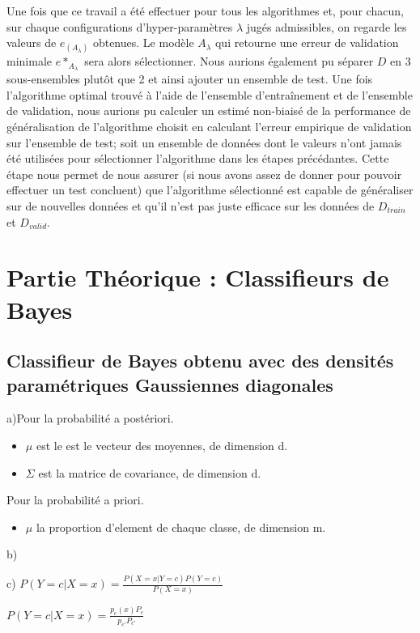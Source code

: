 \documentclass[a4paper,10pt]{article}
\begin{document}
Une fois que ce travail a été effectuer pour tous les algorithmes et, pour chacun, sur chaque configurations d'hyper-paramètres $\lambda$ jugés admissibles, on regarde les valeurs de $e_{(A_{\lambda})}$ obtenues. Le modèle $A_{\lambda}$ qui retourne une erreur de validation minimale $e*_{A_{\lambda}}$ sera alors sélectionner. 
Nous aurions également pu séparer $D$ en 3 sous-ensembles plutôt que 2 et ainsi ajouter un ensemble de test. Une fois l'algorithme optimal trouvé à l'aide de l'ensemble d'entraînement et de l'ensemble de validation, nous aurions pu calculer un estimé non-biaisé de la performance de généralisation de l'algorithme choisit en calculant l'erreur empirique de validation sur l'ensemble de test; soit un ensemble de données dont le valeurs n'ont jamais été utilisées pour sélectionner l'algorithme dans les étapes précédantes. Cette étape nous permet de nous assurer (si nous avons assez de donner pour pouvoir effectuer un test concluent) que l'algorithme sélectionné est capable de généraliser sur de nouvelles données et qu'il n'est pas juste efficace sur les données de $D_{train}$ et $D_{valid}$.



\section{Partie Théorique : Classifieurs de Bayes}

\subsection{Classifieur de Bayes obtenu avec des densités paramétriques Gaussiennes diagonales}

a)Pour la probabilité a postériori.
\begin{itemize}
	\item $\mu$ est le est le vecteur des moyennes, de dimension d.
	\item $\Sigma$ est la matrice de covariance, de dimension d.
\end{itemize}
Pour la probabilité a priori.
\begin{itemize}
	\item $\mu$ la proportion d'element de chaque classe, de dimension m.
\end{itemize}

b)

c)
$P(Y=c | X=x)  = \frac{P(X=x | Y=c) P(Y=c)}{P(X=x)} $

$P(Y=c | X=x)  = \frac{ p_{c}(x) P_{c}}{p_{c'} P_{c'} } $
\end{document}
